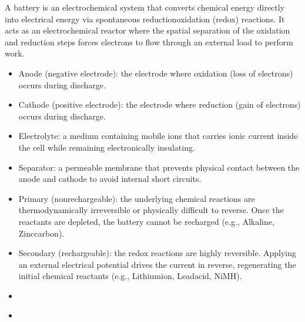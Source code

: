 \documentclass[letterpaper,10pt,english]{jupyterBook}
\begin{document}
\sphinxAtStartPar
A battery is an electrochemical system that converts chemical energy directly into electrical energy via spontaneous reduction\sphinxhyphen{}oxidation (redox) reactions. It acts as an electrochemical reactor where the spatial separation of the oxidation and reduction steps forces electrons to flow through an external load to perform work.

\sphinxAtStartPar
{}
\begin{itemize}
\item {} 
\sphinxAtStartPar
Anode (negative electrode): the electrode where oxidation (loss of electrons) occurs during discharge.

\item {} 
\sphinxAtStartPar
Cathode (positive electrode): the electrode where reduction (gain of electrons) occurs during discharge.

\item {} 
\sphinxAtStartPar
Electrolyte: a medium containing mobile ions that carries ionic current inside the cell while remaining electronically insulating.

\item {} 
\sphinxAtStartPar
Separator: a permeable membrane that prevents physical contact between the anode and cathode to avoid internal short circuits.

\end{itemize}

\sphinxAtStartPar
{}
\begin{itemize}
\item {} 
\sphinxAtStartPar
Primary (non\sphinxhyphen{}rechargeable): the underlying chemical reactions are thermodynamically irreversible or physically difficult to reverse. Once the reactants are depleted, the battery cannot be recharged (e.g., Alkaline, Zinc\sphinxhyphen{}carbon).

\item {} 
\sphinxAtStartPar
Secondary (rechargeable): the redox reactions are highly reversible. Applying an external electrical potential drives the current in reverse, regenerating the initial chemical reactants (e.g., Lithium\sphinxhyphen{}ion, Lead\sphinxhyphen{}acid, NiMH).

\end{itemize}



\sphinxAtStartPar
{}
\begin{itemize}
\item {} 
\sphinxAtStartPar
{\hyperref[\detokenize{ch/batteries-daniell:electro-chemical-batteries-daniell}]{}}

\item {} 
\sphinxAtStartPar
{\hyperref[\detokenize{ch/batteries-li:electro-chemical-batteries-li}]{}}

\end{itemize}
\end{document}
